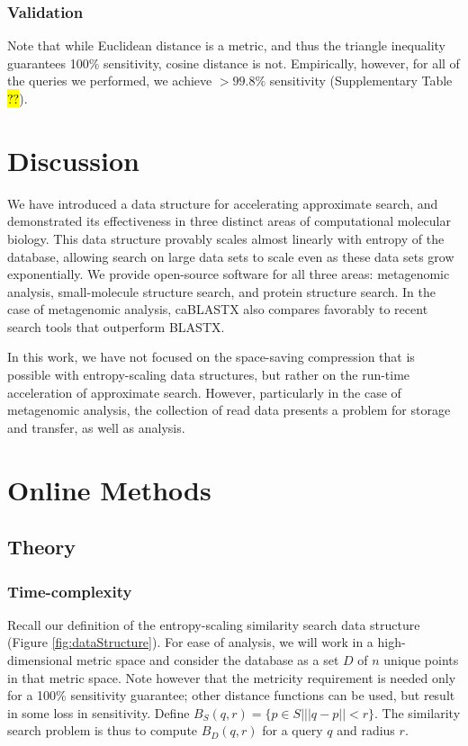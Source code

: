 \documentclass[review,preprint,12pt]{elsarticle}
\theoremstyle{definition}
\theoremstyle{remark}
\numberwithin{equation}{section}
\begin{document}
\subsubsection{Validation}
Note that while Euclidean distance is a metric, and thus the triangle inequality guarantees 100\% sensitivity, cosine distance is not.
Empirically, however, for all of the queries we performed, we achieve $> 99.8\%$ sensitivity (Supplementary Table \hl{??}).

\section{Discussion}

We have introduced a data structure for accelerating approximate search, and
demonstrated its effectiveness in three distinct areas of computational
molecular biology.
This data structure provably scales almost linearly with entropy of the 
database, allowing search on large data sets to scale even as these data sets
grow exponentially.
We provide open-source software for all three areas: metagenomic analysis,
small-molecule structure search, and protein structure search.
In the case of metagenomic analysis, caBLASTX also compares favorably to recent 
search tools that outperform BLASTX.

In this work, we have not focused on the space-saving compression that is
possible with entropy-scaling data structures, but rather on the run-time
acceleration of approximate search.
However, particularly in the case of metagenomic analysis, the collection of 
read data presents a problem for storage and transfer, as well as analysis.



\section{Online Methods}

\subsection{Theory}
\subsubsection{Time-complexity}
Recall our definition of the entropy-scaling similarity search data structure (Figure \ref{fig:dataStructure}).
For ease of analysis, we will work in a high-dimensional metric space and consider the database as a set $D$ of $n$ unique points in that metric space.
Note however that the metricity requirement is needed only for a 100\% sensitivity guarantee; other distance functions can be used, but result in some loss in sensitivity.
Define $B_S(q,r) = \{ p \in S | ||q-p||<r \}$. The similarity search problem is thus to compute $B_D(q,r)$ for a query $q$ and radius $r$.
\end{document}
